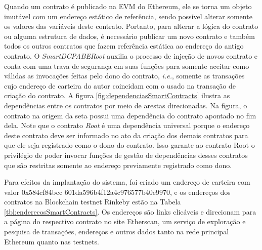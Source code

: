 \documentclass[a4paper,11pt]{article}
\begin{document}
Quando um contrato é publicado na EVM do Ethereum, ele se torna um objeto imutável com um endereço  estático de referência, sendo possível alterar somente os valores das variáveis deste contrato. Portanto, para alterar a lógica do contrato ou alguma estrutura de dados, é necessário publicar um novo contrato e também todos os outros contratos que fazem referência estática ao endereço do antigo contrato.
O \emph{SmartDCPABERoot} auxilia o processo de injeção de novos contrato e conta com uma trava de segurança em suas funções para somente aceitar como válidas as invocações feitas pelo dono do contrato, \emph{i.e.}, somente as transações cujo endereço de carteira do autor coincidam com o usado na transação de criação do contrato.
A figura \ref{fig:dependenciasSmartContracts} ilustra as dependências entre os contratos por meio de arestas direcionadas.
Na figura, o contrato na origem da seta possui uma dependência do contrato apontado no fim dela.
Note que o contrato \emph{Root} é uma dependência universal porque o endereço deste contrato deve ser informado no ato da criação dos demais contratos para que ele seja registrado como o dono do contrato.
Isso garante ao contrato Root o privilégio de poder invocar funções de gestão de dependências desses contratos que são restritas somente ao endereço previamente registrado como dono.

Para efeitos da implantação do sistema, foi criado um endereço de carteira com valor 0x584cf84bcc 601da596b4f12a4c976577b40e9970, e os endereços dos contratos na Blockchain testnet Rinkeby estão na Tabela \ref{tbl:enderecosSmartContracts}.
Os endereços são links clicáveis e direcionam para a página do respectivo contrato no site Etherscan, um serviço de exploração e pesquisa de transações, endereços e outros dados tanto na rede principal Ethereum quanto nas testnets.
\end{document}
